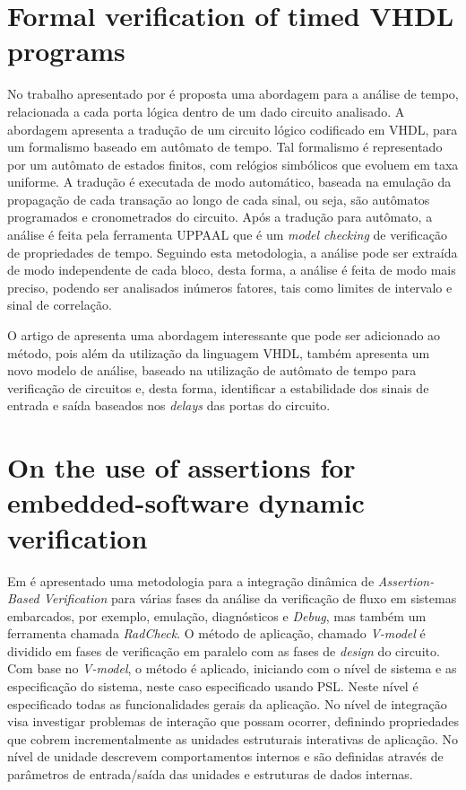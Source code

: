 \section{Formal verification of timed VHDL programs}
No trabalho apresentado por  é proposta uma abordagem para a análise de tempo, relacionada a cada porta lógica dentro de um dado circuito analisado. A abordagem apresenta a tradução de um circuito lógico codificado em VHDL, para um formalismo baseado em autômato de tempo\cite{alur1994theory}. Tal formalismo é representado por um autômato de estados finitos, com relógios simbólicos que evoluem em taxa uniforme. A tradução é executada de modo automático, baseada na emulação da propagação de cada transação ao longo de cada sinal, ou seja, são autômatos programados e cronometrados do circuito. Após a tradução para autômato, a análise é feita pela ferramenta UPPAAL\cite{larsen1997uppaal} que é um \textit{model checking} de verificação de propriedades de tempo. Seguindo esta metodologia, a análise pode ser extraída de modo independente de cada bloco, desta forma, a análise é feita de modo mais preciso, podendo ser analisados inúmeros fatores, tais como limites de intervalo e sinal de correlação.

\par
O artigo de  apresenta uma abordagem interessante que pode ser adicionado ao método, pois além da utilização da linguagem VHDL, também apresenta um novo modelo de análise, baseado na utilização de autômato de tempo para verificação de circuitos e, desta forma, identificar a estabilidade dos sinais de entrada e saída baseados nos \textit{delays} das portas do circuito.

\section{On the use of assertions for embedded-software dynamic verification}
Em  é apresentado uma metodologia para a integração dinâmica de \textit{Assertion-Based Verification} para várias fases da análise da verificação de fluxo em sistemas embarcados, por exemplo, emulação, diagnósticos e \textit{Debug}, mas também um ferramenta chamada \textit{RadCheck}. O método de aplicação, chamado \textit{V-model} é dividido em fases de verificação em paralelo com as fases de \textit{design} do circuito. Com base no \textit{V-model}, o método é aplicado, iniciando com o nível de sistema e as especificação do sistema, neste caso especificado usando PSL. Neste nível é especificado todas as funcionalidades gerais da aplicação. No nível de integração visa investigar problemas de interação que possam ocorrer, definindo propriedades que cobrem incrementalmente as unidades estruturais interativas de aplicação. No nível de unidade descrevem comportamentos internos e são definidas através de parâmetros de entrada/saída das unidades e estruturas de dados internas.

